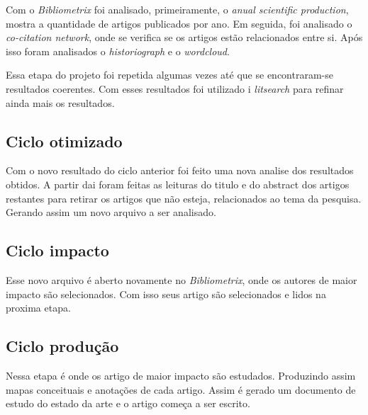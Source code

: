 Com o \textit{Bibliometrix} foi analisado, primeiramente, o \textit{anual scientific production}, mostra a quantidade de artigos publicados por ano. Em seguida, foi analisado o \textit{co-citation network}, onde se verifica se os artigos estão relacionados entre si. Após isso foram analisados o \textit{historiograph} e o \textit{wordcloud}.

Essa etapa do projeto foi repetida algumas vezes até que se encontraram-se resultados coerentes. Com esses resultados foi utilizado i \textit{litsearch} para refinar ainda mais os resultados.

\subsection{Ciclo otimizado}

Com o novo resultado do ciclo anterior foi feito uma nova analise dos resultados obtidos. A partir dai foram feitas as leituras do titulo e do abstract dos artigos restantes para retirar os artigos que não esteja, relacionados ao tema da pesquisa. Gerando assim um novo arquivo a ser analisado.

\subsection{Ciclo impacto}

Esse novo arquivo é aberto novamente no \textit{Bibliometrix}, onde os autores de maior impacto são selecionados. Com isso seus artigo são selecionados e lidos na proxima etapa.

\subsection{Ciclo produção}

Nessa etapa é onde os artigo de maior impacto são estudados. Produzindo assim mapas conceituais e anotações de cada artigo. Assim é gerado um documento de estudo do estado da arte e o artigo começa a ser escrito.
